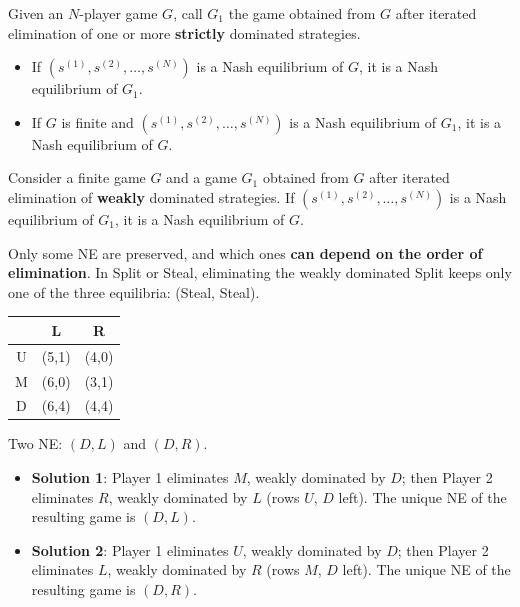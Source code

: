 \documentclass[11pt,a4paper,openany]{book}
\begin{document}
\begin{thmbox}[title=Strict elimination]
Given an $N$-player game $G$, call $G_1$ the game obtained from $G$ after iterated
elimination of one or more \textbf{strictly} dominated strategies.
\begin{itemize}
  \item If $(s^{(1)}, s^{(2)}, \ldots, s^{(N)})$ is a Nash equilibrium of $G$, it is a Nash
        equilibrium of $G_1$.
  \item If $G$ is finite and $(s^{(1)}, s^{(2)}, \ldots, s^{(N)})$ is a Nash equilibrium of
        $G_1$, it is a Nash equilibrium of $G$.
\end{itemize}
\end{thmbox}


\begin{thmbox}[title=Weak elimination]
Consider a finite game $G$ and a game $G_1$ obtained from $G$ after iterated elimination of
\textbf{weakly} dominated strategies. If $(s^{(1)}, s^{(2)}, \ldots, s^{(N)})$ is a Nash
equilibrium of $G_1$, it is a Nash equilibrium of $G$.
\end{thmbox}

\begin{warnbox}[title=Weak elimination loses equilibria]
Only some NE are preserved, and which ones \textbf{can depend on the order of elimination}.
In Split or Steal, eliminating the weakly dominated Split keeps only one of the three
equilibria: (Steal, Steal).
\end{warnbox}

\begin{exbox}[title=The order of elimination matters]
\begin{center}
\begin{tabular}{c|cc}
 & L & R \\ \hline
U & (5,1) & (4,0) \\
M & (6,0) & (3,1) \\
D & (6,4) & (4,4)
\end{tabular}
\end{center}
Two NE: $(D,L)$ and $(D,R)$.
\begin{itemize}
  \item \textbf{Solution 1}: Player 1 eliminates $M$, weakly dominated by $D$; then Player 2
        eliminates $R$, weakly dominated by $L$ (rows $U$, $D$ left). The unique NE of the
        resulting game is $(D, L)$.
  \item \textbf{Solution 2}: Player 1 eliminates $U$, weakly dominated by $D$; then Player 2
        eliminates $L$, weakly dominated by $R$ (rows $M$, $D$ left). The unique NE of the
        resulting game is $(D, R)$.
\end{itemize}
\end{exbox}
\end{document}

